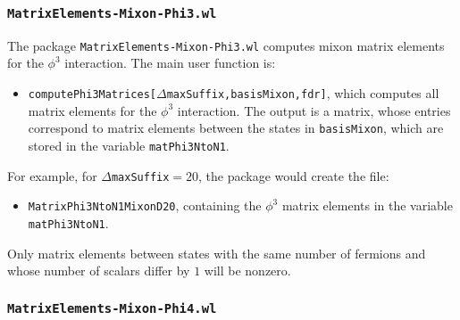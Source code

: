 \documentclass[12pt]{article}
\newcommand\De\Delta
\begin{document}
\subsubsection*{{\tt MatrixElements-Mixon-Phi3.wl}}

The package {\tt MatrixElements-Mixon-Phi3.wl} computes mixon matrix elements for the $\phi^3$ interaction.  The  main user function is:
\begin{itemize}
\item {\tt computePhi3Matrices[$\De$maxSuffix,basisMixon,fdr]}, which computes all matrix elements for  the $\phi^3$ interaction. The output is a matrix, whose entries correspond to matrix elements between the states in {\tt basisMixon}, which are stored in the variable {\tt matPhi3NtoN1}.
\end{itemize}
For example, for {\tt $\De$maxSuffix$=20$}, the package would create the file:
\begin{itemize}
\item {\tt MatrixPhi3NtoN1MixonD20}, containing the $\phi^3$ matrix elements in the variable {\tt matPhi3NtoN1}.
\end{itemize}
Only matrix elements between states with the same number of fermions and whose number of scalars differ by $1$ will be nonzero.

\subsubsection*{{\tt MatrixElements-Mixon-Phi4.wl}}
\end{document}
